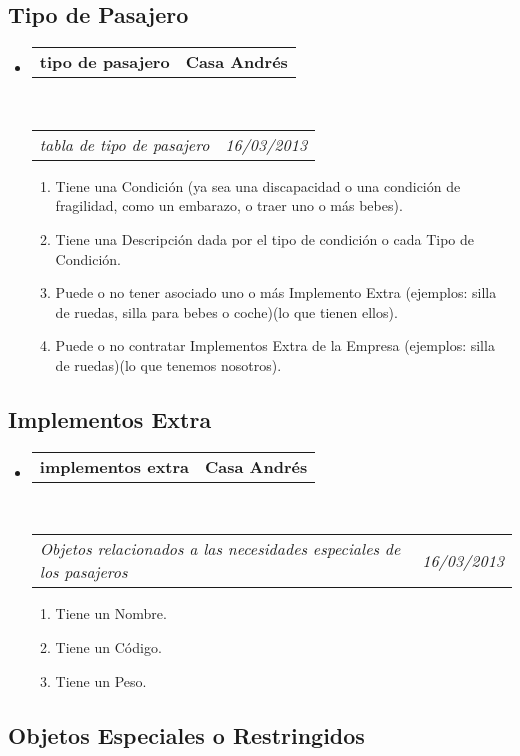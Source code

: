 \documentclass[10pt,letterpaper]{article}
\makeatletter
\newcommand{\headerrow}[2]
{\begin{tabular*}{\linewidth}{l@{\extracolsep{\fill}}r}
	#1 &
	#2 \\
\end{tabular*}}
\makeatother
\begin{document}
\subsection*{Tipo de Pasajero}

\begin{itemize}
	\parskip=0.1em

	\item
	\headerrow
		{\textbf{tipo de pasajero}}
		{\textbf{Casa Andrés}}
	\\
	\headerrow
		{\emph{tabla de tipo de pasajero}}
		{\emph{16/03/2013}}
	\begin{enumerate}
		\item Tiene una Condición (ya sea una discapacidad o una condición de fragilidad, como un embarazo, o traer uno o más bebes).
		\item Tiene una Descripción dada por el tipo de condición o cada Tipo de Condición.
		\item Puede o no tener asociado uno o más Implemento Extra (ejemplos: silla de ruedas, silla para bebes o coche)(lo que tienen ellos).
		\item Puede o no contratar Implementos Extra de la Empresa (ejemplos: silla de ruedas)(lo que tenemos nosotros).
	\end{enumerate}

\end{itemize}


\subsection*{Implementos Extra}

\begin{itemize}
	\parskip=0.1em

	\item
	\headerrow
		{\textbf{implementos extra}}
		{\textbf{Casa Andrés}}
	\\
	\headerrow
		{\emph{Objetos relacionados a las necesidades especiales de los pasajeros}}
		{\emph{16/03/2013}}
	\begin{enumerate}
		\item Tiene un Nombre.
		\item Tiene un Código.
		\item Tiene un Peso.
		
	\end{enumerate}

\end{itemize}


\subsection*{Objetos Especiales o Restringidos}
\end{document}
